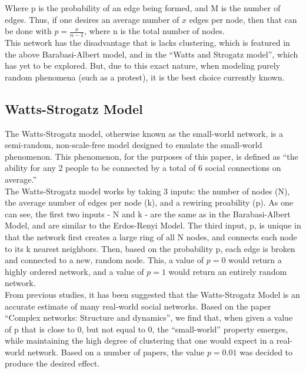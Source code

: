 \documentclass{article}
\numberwithin{equation}{section} %
\begin{document}
\begin{multicols}{2}
  Where p is the probability of an edge being formed, and M is the number of edges. Thus, if one desires an average number of $x$ edges per node, then that can be done with $p = \frac{x}{n-1}$, where n is the total number of nodes. \\

  This network has the disadvantage that is lacks clustering, which is featured in the above Barabasi-Albert model, and in the ``Watts and Strogatz model'', which has yet to be explored. But, due to this exact nature, when modeling purely random phenomena (such as a protest), it is the best choice currently known.

  \subsection{Watts-Strogatz Model}
  \label{Appendix B: Watts-Strogatz}
  The Watts-Strogatz model, otherwise known as the small-world network\cite{WSNet}, is a semi-random, non-scale-free model designed to emulate the small-world phenomenon. This phenomenon, for the purposes of this paper, is defined as ``the ability for any 2 people to be connected by a total of 6 social connections on average.''\cite{small-world} \\

  The Watts-Strogatz model works by taking 3 inputs: the number of nodes (N), the average number of edges per node (k), and a rewiring proability (p). As one can see, the first two inputs - N and k - are the same as in the Barabasi-Albert Model, and are similar to the Erdos-Renyi Model. The third input, p, is unique in that the network first creates a large ring of all N nodes, and connects each node to its k nearest neighbors. Then, based on the probability p, each edge is broken and connected to a new, random node. This, a value of $p=0$ would return a highly ordered network, and a value of $p=1$ would return an entirely random network. \\

  From previous studies,\cite{data-driven WS}\cite{beyond semicircle} it has been suggested that the Watts-Strogatz Model is an accurate estimate of many real-world social networks. Based on the paper ``Complex networks: Structure and dynamics''\cite{CN SD}, we find that, when given a value of p that is close to 0, but not equal to 0, the ``small-world'' property emerges, while maintaining the high degree of clustering that one would expect in a real-world network. Based on a number of papers\cite{WSNet}\cite{beyond semicircle}, the value $p=0.01$ was decided to produce the desired effect. 


\end{multicols}
\end{document}

